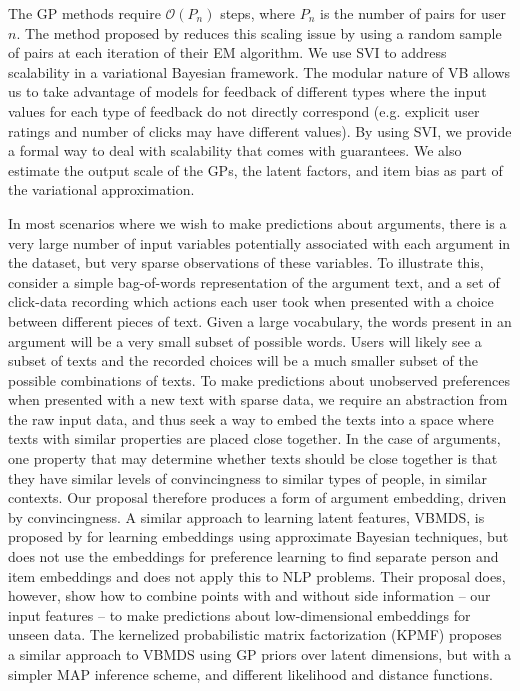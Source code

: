 The GP methods require $\mathcal{O}(P_n)$ steps, where $P_n$ is the number of pairs for 
user $n$. 
The method proposed by \cite{khan2014scalable} reduces this scaling issue by using a random sample of pairs at each iteration of their EM algorithm.
We use SVI to address scalability in a variational Bayesian framework. 
The modular nature of VB allows us to take advantage of models for feedback of different types
where the input values for each type of feedback do not directly correspond (e.g. explicit user ratings and number of clicks may have different values).
By using SVI, we provide a formal way to deal with scalability that comes with guarantees\cite{hoffman2013stochastic}.
We also estimate the output scale of the GPs, the latent factors, and item bias as part of the 
variational approximation. %


In most scenarios where we wish to make predictions about arguments, 
there is a very large number of input variables potentially associated with each argument in the dataset,
but very sparse observations of these variables. 
To illustrate this, consider a simple bag-of-words representation of the argument text, and a set
of click-data recording which actions each user took when presented with a choice between different pieces of text. 
Given a large vocabulary, the words present in an argument will be a very small subset of possible words. Users will likely see a subset of texts and the recorded choices will be a much smaller subset of 
the possible combinations of texts. 
To make predictions about unobserved preferences when presented with a new text with sparse data,
we require an abstraction from the raw input data, and thus seek a way to embed the texts into a space 
where texts with similar properties are placed close together. In the case of arguments, one property
that may determine whether texts should be close together is that they have similar levels of 
convincingness to similar types of people, in similar contexts. Our proposal therefore produces
a form of argument embedding, driven by convincingness.
A similar approach to learning latent features, VBMDS, is proposed by \cite{soh2016distance} for learning embeddings using approximate Bayesian techniques, but does not use the embeddings for 
preference learning to find separate person and item embeddings and does not apply this to NLP problems.
Their proposal does, however, show how to combine points with and without side information -- our
input features -- to make predictions about low-dimensional embeddings for unseen data. 
The kernelized probabilistic matrix factorization (KPMF) \cite{zhou2012kernelized} 
proposes a similar approach to VBMDS using GP priors over latent dimensions, but with a simpler
MAP inference scheme, and different likelihood and distance functions. 

